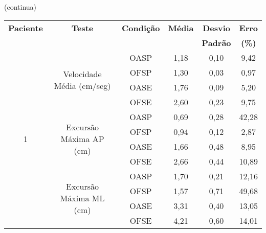 \begin{apendicesenv}
\begin{table}[ht]
\begin{flushright}
(continua)
\end{flushright}
\begin{tabular}{|c|c|c|c|c|c|}
\hline
\textbf{Paciente}   & \textbf{Teste}                             & \textbf{Condição} & \textbf{Média} & \textbf{Desvio} & \textbf{Erro} \\
& & & & \textbf{Padrão} & \textbf{(\%)} \\ \hline
\multirow{12}{*}{1} & \multirow{4}{*}{Velocidade Média (cm/seg)} & OASP\footnotemark{} & 1,18 & 0,10 & 9,42 \\ \cline{3-6} 
 &  & OFSP\footnotemark{} & 1,30 & 0,03 & 0,97 \\ \cline{3-6} 
 &  & OASE\footnotemark{} & 1,76 & 0,09 & 5,20 \\ \cline{3-6} 
 &  & OFSE\footnotemark{} & 2,60 & 0,23 & 9,75 \\ \cline{2-6} 
 & \multirow{4}{*}{Excursão Máxima AP (cm)} & OASP & 0,69 & 0,28 & 42,28 \\ \cline{3-6} 
 &  & OFSP & 0,94 & 0,12 & 2,87 \\ \cline{3-6} 
 &  & OASE & 1,66 & 0,48 & 8,95 \\ \cline{3-6} 
 &  & OFSE & 2,66 & 0,44 & 10,89 \\ \cline{2-6} 
 & \multirow{4}{*}{Excursão Máxima ML (cm)} & OASP & 1,70 & 0,21 & 12,16 \\ \cline{3-6} 
 &  & OFSP & 1,57 & 0,71 & 49,68 \\ \cline{3-6} 
 &  & OASE & 3,31 & 0,40 & 13,05 \\ \cline{3-6} 
 &  & OFSE & 4,21 & 0,60 & 14,01 \\ \hline
\end{tabular}
\end{table}
\pagebreak



\end{apendicesenv}
